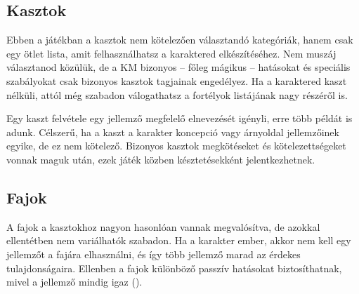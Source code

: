 \subsection{Kasztok}

Ebben a játékban a kasztok nem kötelezően választandó kategóriák, hanem csak egy ötlet lista, amit felhasználhatsz a karaktered elkészítéséhez. Nem muszáj választanod közülük, de a KM bizonyos -- főleg mágikus -- hatásokat és speciális szabályokat csak bizonyos kasztok tagjainak engedélyez. Ha a karaktered kaszt nélküli, attól még szabadon válogathatsz a fortélyok listájának nagy részéről is.

Egy kaszt felvétele egy jellemző megfelelő elnevezését igényli, erre több példát is adunk. Célszerű, ha a kaszt a karakter koncepció vagy árnyoldal jellemzőinek egyike, de ez nem kötelező. Bizonyos kasztok megkötéseket és kötelezettségeket vonnak maguk után, ezek játék közben késztetésekként jelentkezhetnek.

\subsection{Fajok}

A fajok a kasztokhoz nagyon hasonlóan vannak megvalósítva, de azokkal ellentétben nem variálhatók szabadon. Ha a karakter ember, akkor nem kell egy jellemzőt a fajára elhasználni, és így több jellemző marad az érdekes tulajdonságaira. Ellenben a fajok különböző passzív hatásokat biztosíthatnak, mivel a jellemző mindig igaz ().

